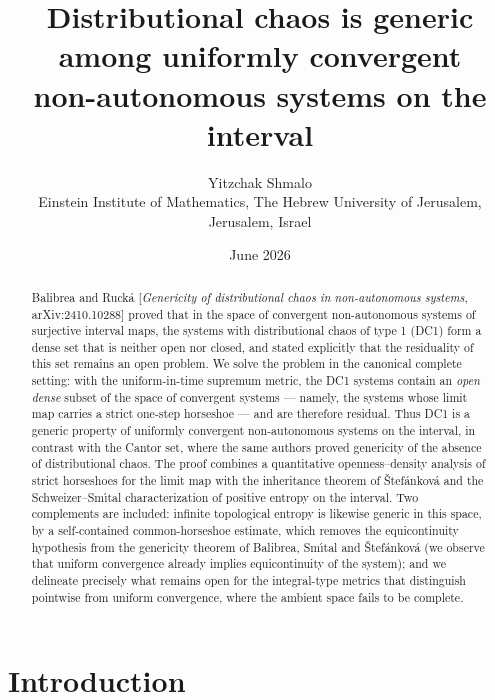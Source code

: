 \documentclass[11pt]{article}
\title{Distributional chaos is generic among uniformly convergent\\
non-autonomous systems on the interval}
\author{Yitzchak Shmalo\\
\small Einstein Institute of Mathematics, The Hebrew University of Jerusalem, Jerusalem, Israel\\
\small }
\date{June 2026}
\begin{document}
\maketitle

\begin{abstract}
Balibrea and Ruck\'a [\emph{Genericity of distributional chaos in non-autonomous
systems}, arXiv:2410.10288] proved that in the space of convergent non-autonomous
systems of surjective interval maps, the systems with distributional chaos of type 1
(DC1) form a dense set that is neither open nor closed, and stated explicitly that
the residuality of this set remains an open problem.  We solve the problem in the
canonical complete setting: with the uniform-in-time supremum metric, the DC1
systems contain an \emph{open dense} subset of the space of convergent systems ---
namely, the systems whose limit map carries a strict one-step horseshoe --- and are
therefore residual.  Thus DC1 is a generic property of uniformly convergent
non-autonomous systems on the interval, in contrast with the Cantor set, where the
same authors proved genericity of the absence of distributional chaos.  The proof
combines a quantitative openness--density analysis of strict horseshoes for the limit
map with the inheritance theorem of \v Stef\'ankov\'a and the
Schweizer--Sm\'\i tal characterization of positive entropy on the interval.  Two
complements are included: infinite topological entropy is likewise generic in this
space, by a self-contained common-horseshoe estimate, which removes the
equicontinuity hypothesis from the genericity theorem of Balibrea, Sm\'\i tal and
\v Stef\'ankov\'a (we observe that uniform convergence already implies
equicontinuity of the system); and we delineate precisely what remains open for the
integral-type metrics that distinguish pointwise from uniform convergence, where the
ambient space fails to be complete.
\end{abstract}

\section{Introduction}\label{sec:intro}
\end{document}

